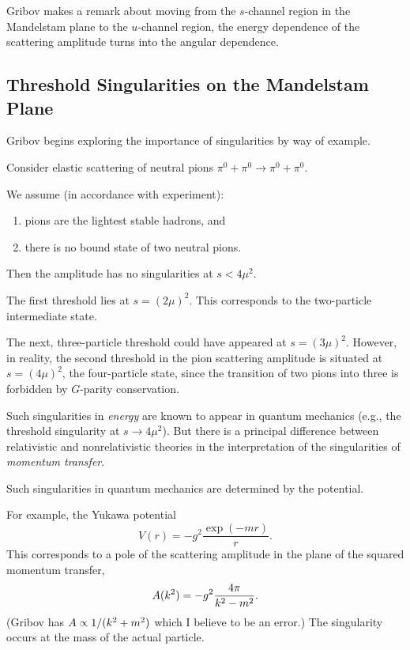 \M[-1]
Gribov makes a remark about moving from the $s$-channel region in the
Mandelstam plane to the $u$-channel region, the energy dependence of the
scattering amplitude turns into the angular dependence.

\subsection{Threshold Singularities on the Mandelstam Plane}

\M
Gribov begins exploring the importance of singularities by way of
example.

\M[1]
Consider elastic scattering of neutral pions
$\pi^{0}+\pi^{0}\to\pi^{0}+\pi^{0}$.

 We assume (in accordance with experiment):
\begin{enumerate}
\item pions are the lightest stable hadrons, and
\item there is no bound state of two neutral pions.
\end{enumerate}

\M Then the amplitude has no singularities at $s<4\mu^{2}$.

\M
The first threshold lies at $s=(2\mu)^{2}$. This corresponds to the
two-particle intermediate state.

\M The next, three-particle threshold could have appeared at
$s=(3\mu)^{2}$.
However, in reality, the second threshold in the pion scattering
amplitude is situated at $s=(4\mu)^{2}$, the four-particle state, since
the transition of two pions into three is forbidden by $G$-parity
conservation.

Such singularities in \emph{energy} are known to appear in quantum
mechanics (e.g., the threshold singularity at $s\to 4\mu^{2}$).
But there is a principal difference between relativistic and
nonrelativistic theories in the interpretation of the singularities of
\emph{momentum transfer}.

 Such singularities in quantum mechanics are
determined by the potential.

 For example, the Yukawa potential
\begin{equation}
V(r)=-g^{2}\frac{\exp(- mr)}{r}.
\end{equation}
This corresponds to a pole of the scattering amplitude in the plane of
the squared momentum transfer,
\begin{equation}
A(k^{2})=-g^{2}\frac{4\pi}{k^{2}-m^{2}}.
\end{equation}
(Gribov has $A\propto 1/(k^{2}+m^{2})$ which I believe to be an error.)
The singularity occurs at the mass of the actual particle.

